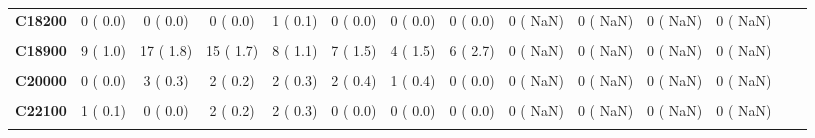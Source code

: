 \documentclass[
]{article}
\begin{document}
\begin{table}[H]
\begin{tabular}[t]{>{\raggedright\arraybackslash}p{5em}ccccccccccccc}
\textbf{C18200} & 0 (  0.0) & 0 (  0.0) & 0 (  0.0) & 1 (  0.1) & 0 (  0.0) & 0 (  0.0) & 0 (  0.0) & 0 (  NaN) & 0 (  NaN) & 0 (  NaN) & 0 (  NaN) &  & \\
\textbf{\cellcolor{gray!10}{C18700}} & \cellcolor{gray!10}{1 (  0.1)} & \cellcolor{gray!10}{1 (  0.1)} & \cellcolor{gray!10}{0 (  0.0)} & \cellcolor{gray!10}{0 (  0.0)} & \cellcolor{gray!10}{0 (  0.0)} & \cellcolor{gray!10}{0 (  0.0)} & \cellcolor{gray!10}{0 (  0.0)} & \cellcolor{gray!10}{0 (  NaN)} & \cellcolor{gray!10}{0 (  NaN)} & \cellcolor{gray!10}{0 (  NaN)} & \cellcolor{gray!10}{0 (  NaN)} & \cellcolor{gray!10}{} & \cellcolor{gray!10}{}\\
\textbf{C18900} & 9 (  1.0) & 17 (  1.8) & 15 (  1.7) & 8 (  1.1) & 7 (  1.5) & 4 (  1.5) & 6 (  2.7) & 0 (  NaN) & 0 (  NaN) & 0 (  NaN) & 0 (  NaN) &  & \\
\textbf{\cellcolor{gray!10}{C19000}} & \cellcolor{gray!10}{0 (  0.0)} & \cellcolor{gray!10}{1 (  0.1)} & \cellcolor{gray!10}{0 (  0.0)} & \cellcolor{gray!10}{0 (  0.0)} & \cellcolor{gray!10}{0 (  0.0)} & \cellcolor{gray!10}{0 (  0.0)} & \cellcolor{gray!10}{0 (  0.0)} & \cellcolor{gray!10}{0 (  NaN)} & \cellcolor{gray!10}{0 (  NaN)} & \cellcolor{gray!10}{0 (  NaN)} & \cellcolor{gray!10}{0 (  NaN)} & \cellcolor{gray!10}{} & \cellcolor{gray!10}{}\\
\textbf{C20000} & 0 (  0.0) & 3 (  0.3) & 2 (  0.2) & 2 (  0.3) & 2 (  0.4) & 1 (  0.4) & 0 (  0.0) & 0 (  NaN) & 0 (  NaN) & 0 (  NaN) & 0 (  NaN) &  & \\
\textbf{\cellcolor{gray!10}{C22000}} & \cellcolor{gray!10}{3 (  0.3)} & \cellcolor{gray!10}{1 (  0.1)} & \cellcolor{gray!10}{1 (  0.1)} & \cellcolor{gray!10}{0 (  0.0)} & \cellcolor{gray!10}{1 (  0.2)} & \cellcolor{gray!10}{0 (  0.0)} & \cellcolor{gray!10}{0 (  0.0)} & \cellcolor{gray!10}{0 (  NaN)} & \cellcolor{gray!10}{0 (  NaN)} & \cellcolor{gray!10}{0 (  NaN)} & \cellcolor{gray!10}{0 (  NaN)} & \cellcolor{gray!10}{} & \cellcolor{gray!10}{}\\
\textbf{C22100} & 1 (  0.1) & 0 (  0.0) & 2 (  0.2) & 2 (  0.3) & 0 (  0.0) & 0 (  0.0) & 0 (  0.0) & 0 (  NaN) & 0 (  NaN) & 0 (  NaN) & 0 (  NaN) &  & \\
\textbf{\cellcolor{gray!10}{C22900}} & \cellcolor{gray!10}{0 (  0.0)} & \cellcolor{gray!10}{2 (  0.2)} & \cellcolor{gray!10}{0 (  0.0)} & \cellcolor{gray!10}{0 (  0.0)} & \cellcolor{gray!10}{0 (  0.0)} & \cellcolor{gray!10}{1 (  0.4)} & \cellcolor{gray!10}{0 (  0.0)} & \cellcolor{gray!10}{0 (  NaN)} & \cellcolor{gray!10}{0 (  NaN)} & \cellcolor{gray!10}{0 (  NaN)} & \cellcolor{gray!10}{0 (  NaN)} & \cellcolor{gray!10}{} & \cellcolor{gray!10}{}\\

\end{tabular}
\end{table}
\end{document}

